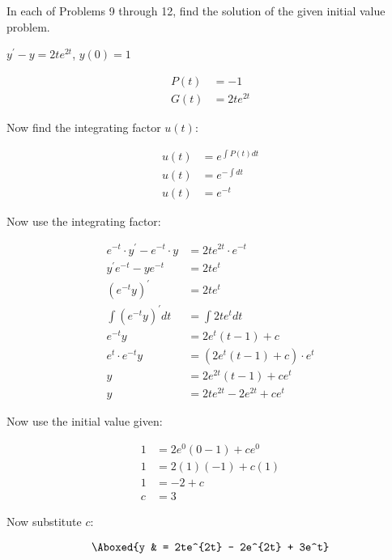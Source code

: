\documentclass{lapchomework}
\begin{document}
\begin{instructions}
In each of Problems 9 through 12, find the solution of the given initial
value problem.
\end{instructions}

\begin{problems}

\problem [9] $y^{\prime}-y=2te^{2t}$, $y(0)=1$

\begin{solution}

\step \begin{align*}
P(t) & = -1 \\
G(t) & = 2te^{2t} 
\end{align*}

\step Now find the integrating factor $u(t)$:

\step \begin{align*}
u(t) & = e^{\int P(t) dt} \\
u(t) & = e^{- \int dt} \\
u(t) & = e^{-t}
\end{align*}

\step Now use the integrating factor:

\step \begin{align*}
e^{-t} \cdot y^{\prime} - e^{-t} \cdot y & = 2te^{2t} \cdot e^{-t} \\
y^{\prime}e^{-t} - ye^{-t} & = 2te^t \\
\left(e^{-t}y\right)^{\prime} & = 2te^{t} \\
\int \left(e^{-t}y\right)^{\prime} dt & = \int 2te^{t} dt \\
e^{-t}y & = 2e^t(t-1)+c \\
e^t \cdot e^{-t}y & = \left(2e^t(t-1)+c\right) \cdot e^t \\
y & = 2e^{2t}(t-1)+ce^t \\
y & = 2te^{2t} - 2e^{2t} + ce^t
\end{align*}

\step Now use the initial value given:

\step \begin{align*}
1 & = 2e^{0}(0-1)+ce^0 \\
1 & = 2(1)(-1)+c(1) \\
1 & = -2 + c \\
c & = 3
\end{align*}

\step Now substitute $c$:

\step \begin{align*}
\Aboxed{y & = 2te^{2t} - 2e^{2t} + 3e^t}
\end{align*}


\end{solution}
\end{problems}
\end{document}
